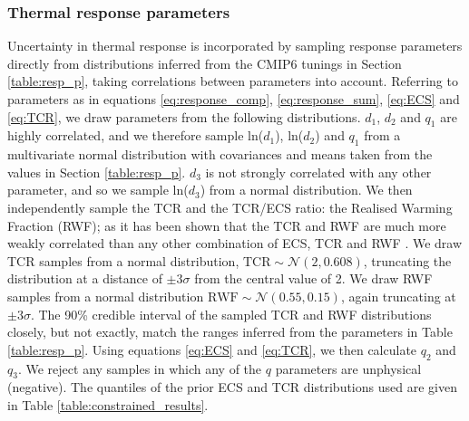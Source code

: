 \documentclass[gmd, manuscript]{copernicus}
\begin{document}
\subsubsection{Thermal response parameters} \label{response_sampling}
Uncertainty in thermal response is incorporated by sampling response parameters directly from distributions inferred from the CMIP6 tunings in Section \ref{table:resp_p}, taking correlations between parameters into account. Referring to parameters as in equations \ref{eq:response_comp}, \ref{eq:response_sum}, \ref{eq:ECS} and \ref{eq:TCR}, we draw parameters from the following distributions. $d_1$, $d_2$ and $q_1$ are highly correlated, and we therefore sample ln($d_1$), ln($d_2$) and $q_1$ from a multivariate normal distribution with covariances and means taken from the values in Section \ref{table:resp_p}. $d_3$ is not strongly correlated with any other parameter, and so we sample ln($d_3$) from a normal distribution. We then independently sample the TCR and the TCR/ECS ratio: the Realised Warming Fraction (RWF); as it has been shown that the TCR and RWF are much more weakly correlated than any other combination of ECS, TCR and RWF \citep{Millar2015}. We draw TCR samples from a normal distribution, $\mathrm{TCR}\sim\mathcal{N}\left(2,0.608\right)$, truncating the distribution at a distance of $\pm3\sigma$ from the central value of 2. We draw RWF samples from a normal distribution $\mathrm{RWF}\sim\mathcal{N}\left(0.55,0.15\right)$, again truncating at $\pm3\sigma$. The 90\% credible interval of the sampled TCR and RWF distributions closely, but not exactly, match the ranges inferred from the parameters in Table \ref{table:resp_p}. Using equations \ref{eq:ECS} and \ref{eq:TCR}, we then calculate $q_2$ and $q_3$. We reject any samples in which any of the $q$ parameters are unphysical (negative). The quantiles of the prior ECS and TCR distributions used are given in Table \ref{table:constrained_results}.
\end{document}
